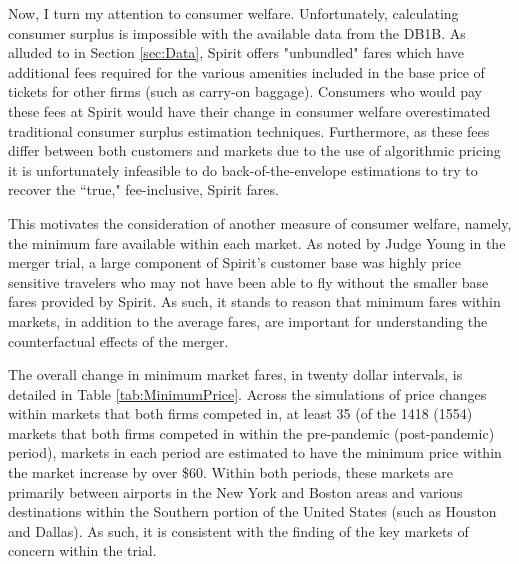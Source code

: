 \documentclass{article}
\begin{document}

     Now, I turn my attention to consumer welfare. Unfortunately, calculating consumer surplus is impossible with the available data from the DB1B. As alluded to in Section \ref{sec:Data}, Spirit offers "unbundled" fares which have additional fees required for the various amenities included in the base price of tickets for other firms (such as carry-on baggage). Consumers who would pay these fees at Spirit would have their change in consumer welfare overestimated traditional consumer surplus estimation techniques. Furthermore, as these fees differ between both customers and markets due to the use of algorithmic pricing \citep{senate_permanent_committee_on_investigations_majority_2024} it is unfortunately infeasible to do back-of-the-envelope estimations to try to recover the ``true," fee-inclusive, Spirit fares. 
     
     This motivates the consideration of another measure of consumer welfare, namely, the minimum fare available within each market. As noted by Judge Young in the merger trial, a large component of Spirit's customer base was highly price sensitive travelers who may not have been able to fly without the smaller base fares provided by Spirit. As such, it stands to reason that minimum fares within markets, in addition to the average fares, are important for understanding the counterfactual effects of the merger. 
     
     The overall change in minimum market fares, in twenty dollar intervals, is detailed in Table \ref{tab:MinimumPrice}. Across the simulations of price changes within markets that both firms competed in, at least 35 (of the 1418 (1554) markets that both firms competed in within the pre-pandemic (post-pandemic) period), markets in each period are estimated to have the minimum price within the market increase by over \$60. Within both periods, these markets are primarily between airports in the New York and Boston areas and various destinations within the Southern portion of the United States (such as Houston and Dallas). As such, it is consistent with the finding of the key markets of concern within the trial. 
\end{document}
